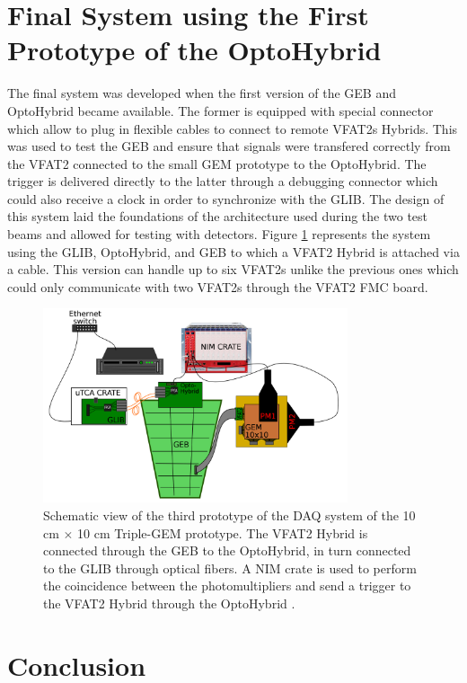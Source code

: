   \section{Final System using the First Prototype of the OptoHybrid}

    The final system was developed when the first version of the GEB and OptoHybrid became available. The former is equipped with special connector which allow to plug in flexible cables to connect to remote VFAT2s Hybrids. This was used to test the GEB and ensure that signals were transfered correctly from the VFAT2 connected to the small GEM prototype to the OptoHybrid. The trigger is delivered directly to the latter through a debugging connector which could also receive a clock in order to synchronize with the GLIB. The design of this system laid the foundations of the architecture used during the two test beams and allowed for testing with detectors. Figure \ref{fig:III-1-sys-3} represents the system using the GLIB, OptoHybrid, and GEB to which a VFAT2 Hybrid is attached via a cable. This version can handle up to six VFAT2s unlike the previous ones which could only communicate with two VFAT2s through the VFAT2 FMC board.

    \begin{figure}[t!]
      \centering
      \includegraphics[width=0.8\textwidth]{img/III-1-arch/sys_3.png}
      \caption{Schematic view of the third prototype of the DAQ system of the 10 cm $ \times $ 10 cm Triple-GEM prototype. The VFAT2 Hybrid is connected through the GEB to the OptoHybrid, in turn connected to the GLIB through optical fibers. A NIM crate is used to perform the coincidence between the photomultipliers and send a trigger to the VFAT2 Hybrid through the OptoHybrid \cite{Leonard:2065693}.}
      \label{fig:III-1-sys-3}
    \end{figure}

  \section{Conclusion}

